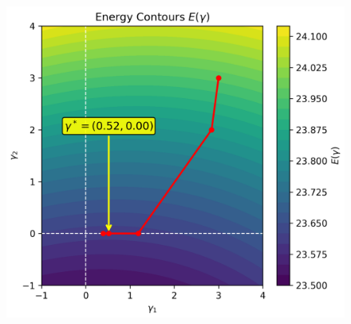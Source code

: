 \documentclass[10pt,t]{beamer}
\begin{document}
\begin{frame}
\begin{columns}[c]
        \begin{column}{0.65\textwidth}
            \begin{figure}
                \centering
                \includegraphics[width=1\textwidth]{figures/energy_surface_contours.png}
            \end{figure}
        \end{column}
    \end{columns}

\end{frame}
\end{document}
